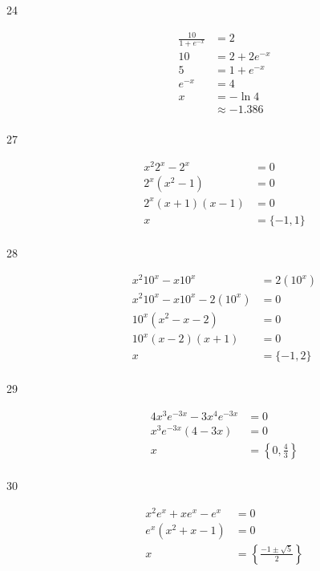 \documentclass{exam}
\begin{document}
\begin{description}
      \item[24]
        \begin{align*}
          \frac{10}{1 + e^{-x}} &= 2 \\
          10                    &= 2 + 2e^{-x} \\
          5                     &= 1 + e^{-x} \\
          e^{-x}                &= 4 \\
          x                     &= -\ln 4 \\
                                &\approx \boxed{-1.386} \\
        \end{align*}

      \item[27]
        \begin{align*}
          x^2 2^x - 2^x              &= 0 \\
          2^x \left( x^2 - 1 \right) &= 0 \\
          2^x(x + 1)(x - 1)          &= 0 \\
          x                          &= \boxed{ \{ -1, 1 \} } \\
        \end{align*}

      \item[28]
        \begin{align*}
          x^2 10^x - x 10^x           &= 2(10^x) \\
          x^2 10^x - x 10^x - 2(10^x) &= 0 \\
           10^x (x^2  - x  - 2)       &= 0 \\
           10^x (x - 2)(x + 1)        &= 0 \\
          x                           &= \boxed{ \{ -1, 2 \} } \\
        \end{align*}

      \item[29]
        \begin{align*}
          4x^3 e^{-3x} - 3x^4e^{-3x}        &= 0 \\
          x^3 e^{-3x} \left( 4 - 3x \right) &= 0 \\
          x                                 &= \boxed{ \left\{ 0, \frac{4}{3} \right\} } \\
        \end{align*}

      \item[30]
        \begin{align*}
          x^2e^x + xe^x - e^x            &= 0 \\
          e^x \left( x^2 + x - 1 \right) &= 0 \\
          x                              &= \boxed{ \left\{ \frac{ - 1 \pm \sqrt{5}}{2} \right\} } \\
        \end{align*}


\end{description}
\end{document}
